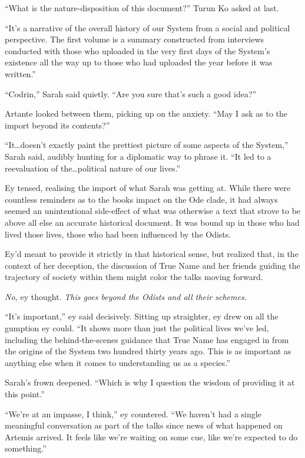 ``What is the nature-disposition of this document?'' Turun Ko asked at last.

``It's a narrative of the overall history of our System from a social and political perspective. The first volume is a summary constructed from interviews conducted with those who uploaded in the very first days of the System's existence all the way up to those who had uploaded the year before it was written.''

``Codrin,'' Sarah said quietly. ``Are you sure that's such a good idea?''

Artante looked between them, picking up on the anxiety. ``May I ask as to the import beyond its contents?''

``It\ldots doesn't exactly paint the prettiest picture of some aspects of the System,'' Sarah said, audibly hunting for a diplomatic way to phrase it. ``It led to a reevaluation of the\ldots political nature of our lives.''

Ey tensed, realising the import of what Sarah was getting at. While there were countless reminders as to the books impact on the Ode clade, it had always seemed an unintentional side-effect of what was otherwise a text that strove to be above all else an accurate historical document. It was bound up in those who had lived those lives, those who had been influenced by the Odists.

Ey'd meant to provide it strictly in that historical sense, but realized that, in the context of her deception, the discussion of True Name and her friends guiding the trajectory of society within them might color the talks moving forward.

\emph{No,} ey thought. \emph{This goes beyond the Odists and all their schemes.}

``It's important,'' ey said decisively. Sitting up straighter, ey drew on all the gumption ey could. ``It shows more than just the political lives we've led, including the behind-the-scenes guidance that True Name has engaged in from the origins of the System two hundred thirty years ago. This is as important as anything else when it comes to understanding us as a species.''

Sarah's frown deepened. ``Which is why I question the wisdom of providing it at this point.''

``We're at an impasse, I think,'' ey countered. ``We haven't had a single meaningful conversation as part of the talks since news of what happened on Artemis arrived. It feels like we're waiting on some cue, like we're expected to do something.''

